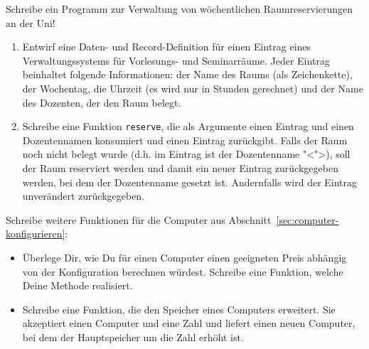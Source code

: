 \begin{aufgabe}

  Schreibe ein Programm zur Verwaltung von wöchentlichen
  Raumreservierungen an der Uni!

  \begin{enumerate}
  \item Entwirf eine Daten- und Record-Definition für einen Eintrag eines
    Verwaltungssystems für Vorlesungs- und Seminarräume. Jeder Eintrag beinhaltet
    folgende Informationen: der Name des Raums (als Zeichenkette), der Wochentag,
    die Uhrzeit (es wird nur in Stunden gerechnet) und der Name des Dozenten, der
    den Raum belegt.

  \item Schreibe eine Funktion \texttt{reserve}, die als Argumente einen Eintrag und einen
    Dozentennamen konsumiert und einen Eintrag zurückgibt. Falls der Raum noch nicht belegt
    wurde (d.h. im Eintrag ist der Dozentenname "<">), soll der Raum reserviert werden und
    damit ein neuer Eintrag zurückgegeben werden, bei dem der Dozentenname gesetzt ist.
    Andernfalls wird der Eintrag unverändert zurückgegeben.
  \end{enumerate}
\end{aufgabe}


\begin{aufgabe}

  Schreibe weitere Funktionen für die Computer aus Abschnitt~\ref{sec:computer-konfigurieren}:
  \begin{itemize}
  \item Überlege Dir, wie Du für einen Computer einen
    geeigneten Preis abhängig von der Konfiguration berechnen würdest.
    Schreibe eine Funktion, welche Deine Methode realisiert.
  \item Schreibe eine Funktion, die den Speicher eines Computers
    erweitert.  Sie akzeptiert einen Computer und eine Zahl und liefert
    einen neuen Computer, bei dem der Hauptspeicher um die Zahl erhöht
    ist.
  \end{itemize}
\end{aufgabe}

